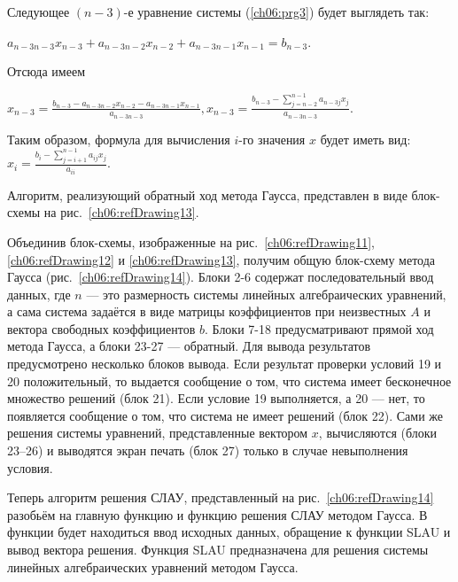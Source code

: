 Следующее $(n-3)$-е уравнение системы (\ref{ch06:prg3}) будет выглядеть так:

 $a_{n-3n-3}x_{n-3}+a_{n-3n-2}x_{n-2}+a_{n-3n-1}x_{n-1}=b_{n-3}$.

Отсюда имеем

 $x_{n-3}=\frac{b_{n-3}-a_{n-3n-2}x_{n-2}-a_{n-3n-1}x_{n-1}}{a_{n-3n-3}},x_{n-3}=
\frac{b_{n-3}-\sum\limits_{j=n-2}^{n-1}{a_{n-3j}x_j}}{a_{n-3n-3}}$.

Таким образом, формула для вычисления $i$-го значения $x$ будет иметь вид:
$x_i=\frac{b_i-\sum\limits_{j=i+1}^{n-1}{a_{ij}x_j}}{a_{ii}}$.

Алгоритм, реализующий обратный ход метода Гаусса, представлен в виде блок-схемы на рис.~\ref{ch06:refDrawing13}.



Объединив блок-схемы, изображенные на рис.~\ref{ch06:refDrawing11}, \ref{ch06:refDrawing12} и \ref{ch06:refDrawing13},
получим общую блок-схему метода Гаусса (рис.~\ref{ch06:refDrawing14}). Блоки 2-6 содержат последовательный ввод данных,
где $n$ --- это размерность системы линейных алгебраических уравнений, а сама система задаётся в виде матрицы коэффициентов
при неизвестных $A$ и вектора свободных коэффициентов $b$. Блоки 7-18 предусматривают прямой ход метода Гаусса, а блоки
23-27 --- обратный. Для вывода результатов предусмотрено несколько блоков вывода. Если результат проверки условий 19 и 20
положительный, то выдается сообщение о том, что система имеет бесконечное множество решений (блок 21). Если условие 19
выполняется, а 20 --- нет, то появляется сообщение о том, что система не имеет решений (блок 22). Сами же решения системы
уравнений, представленные вектором $x$, вычисляются (блоки 23–26) и выводятся экран печать (блок 27) только в случае
невыполнения условия.

Теперь алгоритм решения СЛАУ, представленный на рис.~\ref{ch06:refDrawing14} разобьём на главную функцию 
и функцию решения СЛАУ методом Гаусса. В функции  будет находиться ввод исходных данных, обращение к
функции SLAU и вывод вектора решения. Функция SLAU предназначена для
решения системы линейных алгебраических уравнений методом Гаусса.

